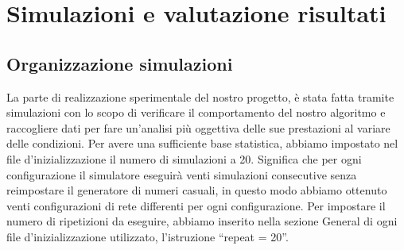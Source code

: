 \chapter{Simulazioni e valutazione risultati}
\label{chap:sim_val}

\section{Organizzazione simulazioni}
La parte di realizzazione sperimentale del nostro progetto, è stata fatta tramite simulazioni con lo scopo di verificare il comportamento del nostro algoritmo e raccogliere dati per fare un'analisi più oggettiva delle sue prestazioni al variare delle condizioni. Per avere una sufficiente base statistica, abbiamo impostato nel file d'inizializzazione il numero di simulazioni a 20. Significa che per ogni configurazione il simulatore eseguirà venti simulazioni consecutive senza reimpostare il generatore di numeri casuali, in questo modo abbiamo ottenuto venti configurazioni di rete differenti per ogni configurazione. Per impostare il numero di ripetizioni da eseguire, abbiamo inserito nella sezione General di ogni file d'inizializzazione utilizzato, l'istruzione “repeat = 20”.

